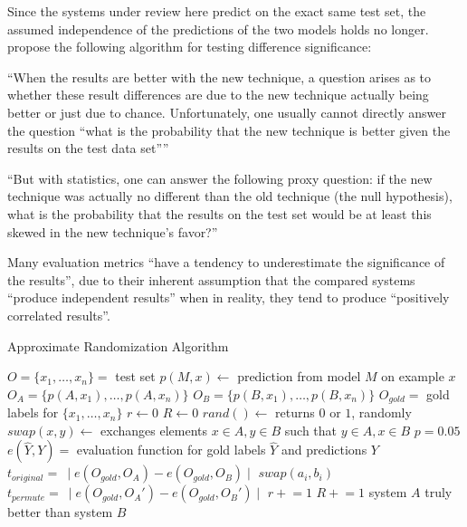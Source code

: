 Since the systems under review here predict on the exact same test set, the assumed independence
of the predictions of the two models holds no longer. \citet{morgan2005statistical} propose
the following algorithm for testing difference significance:

``When the results are better with the new technique, a question arises as to whether
these result differences are due to the new technique actually being better or just due to
chance. Unfortunately, one usually cannot directly answer the question “what is the probability
that the new technique is better given the results on the test data set”'' \citep{yeh2000more}

``But with statistics, one can answer the following proxy question: if the new technique was
actually no different than the old technique (the null hypothesis), what is the probability
that the results on the test set would be at least this skewed in the new technique’s
favor?'' \citep{yeh2000more}

Many evaluation metrics ``have a tendency to underestimate the significance of the results'',
due to their inherent assumption that the compared systems ``produce independent results''
when in reality, they tend to produce ``positively correlated results''. \citep{yeh2000more}


\begin{algorithm}
\caption{Approximate Randomization Algorithm}
\label{alg:approximate-randomization}
	\begin{algorithmic}[1]
    \STATE $O = \{x_1, \dotsc, x_n\} =$ test set
    \STATE $p(M,x) \leftarrow$ prediction from model $M$ on example $x$
    \STATE $O_A = \{p(A,x_1), \dotsc, p(A,x_n)\}$
    \STATE $O_B = \{p(B,x_1), \dotsc, p(B,x_n)\}$
    \STATE $O_{gold} =$ gold labels for $\{x_1, \dotsc, x_n\}$
    \STATE $r \leftarrow 0$
    \STATE $R \leftarrow 0$
    \STATE $rand() \leftarrow$ returns $0$ or $1$, randomly
    \STATE $swap(x,y) \leftarrow$ exchanges elements $x \in A,y \in B$ such that $y \in A, x \in B$
    \STATE $p = 0.05$
    \STATE $e(\hat{Y},Y) =$ evaluation function for gold labels $\hat{Y}$ and predictions $Y$
    \STATE $t_{original} =\ \mid e(O_{gold},O_A) - e(O_{gold},O_B) \mid$
          \STATE $swap(a_i,b_i)$
        \ENDIF
      \ENDFOR
      \STATE $t_{permute} =\ \mid e(O_{gold},O_A') - e(O_{gold},O_B') \mid$
        \STATE $r \mathrel{+}= 1$
      \ENDIF
      \STATE $R \mathrel{+}= 1$
    \ENDWHILE
      \STATE system $A$ truly better than system $B$
    \ENDIF
  \end{algorithmic}
\end{algorithm}


